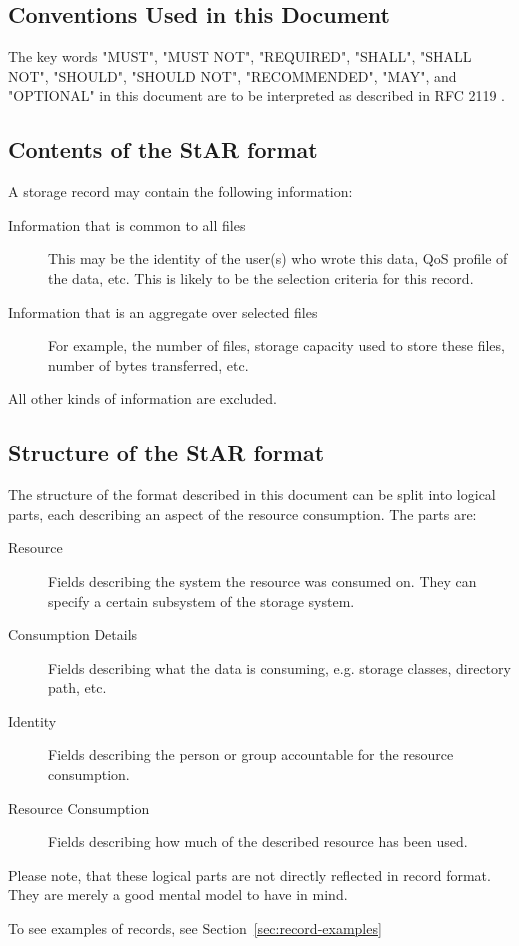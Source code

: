\subsection{Conventions Used in this Document}
The key words "MUST", "MUST NOT", "REQUIRED", "SHALL", "SHALL NOT", 
"SHOULD", "SHOULD NOT", "RECOMMENDED",  "MAY", and 
"OPTIONAL" in this document are to be interpreted as described in
RFC 2119 \cite{rfc2119}.


\subsection{Contents of the StAR format}
A storage record may contain the following information:
\begin{description}
\item[Information that is common to all files] This may be the identity of the 
user(s) who wrote this data, QoS profile of the data, etc. This is likely to be 
the selection criteria for this record. 
\item[Information that is an aggregate over selected files] For example, the 
number of files, storage capacity used to store these files, number of bytes 
transferred, etc. 
\end{description}
All other kinds of information are excluded.

\subsection{Structure of the StAR format}

The structure of the format described in this document can be split into
logical parts, each describing an aspect of the resource consumption. 
The parts are:

\begin{description}

\item[Resource] Fields describing the system the resource was consumed on. They 
can specify a certain subsystem of the storage system.

\item[Consumption Details] Fields describing what the data is consuming, e.g. 
storage classes, directory path, etc.

\item[Identity] Fields describing the person or group accountable for the
resource consumption.

\item[Resource Consumption] Fields describing how much of the described
resource has been used.

\end{description}

Please note, that these logical parts are not directly reflected in record 
format. They are merely a good mental model to have in mind.

To see examples of records, see Section~\ref{sec:record-examples}
